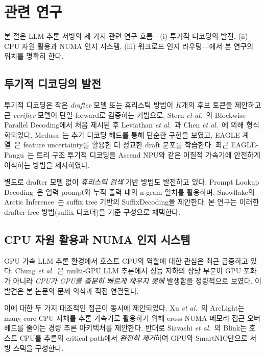 
\section{관련 연구}
\label{sec:related}

본 절은 LLM 추론 서빙의 세 가지 관련 연구 흐름---(i) 투기적 디코딩의 발전, (ii) CPU 자원 활용과 NUMA 인지 시스템, (iii) 워크로드 인지 라우팅---에서 본 연구의 위치를 명확히 한다.

\subsection{투기적 디코딩의 발전}

투기적 디코딩은 작은 \emph{drafter} 모델 또는 휴리스틱 방법이 $K$개의 후보 토큰을 제안하고 큰 \emph{verifier} 모델이 단일 forward로 검증하는 기법으로, Stern \emph{et al.}~\cite{stern2018blockwise}의 Blockwise Parallel Decoding에서 처음 제시된 후 Leviathan \emph{et al.}~\cite{leviathan2023spec}과 Chen \emph{et al.}~\cite{chen2023spec}에 의해 형식화되었다.
Medusa~\cite{cai2024medusa}는 추가 디코딩 헤드를 통해 단순한 구현을 보였고, EAGLE 계열~\cite{li2024eagle, li2025eagle3}은 feature uncertainty를 활용한 더 정교한 draft 분포를 학습한다.
최근 EAGLE-Pangu~\cite{han2026eaglepangu}는 트리 구조 투기적 디코딩을 Ascend NPU와 같은 이질적 가속기에 안전하게 이식하는 방법을 제시하였다.

별도로 drafter 모델 없이 \emph{휴리스틱 검색} 기반 방법도 발전하고 있다.
Prompt Lookup Decoding~\cite{saxena2024prompt}은 입력 prompt와 누적 출력 내의 n-gram 일치를 활용하며, Snowflake의 Arctic Inference~\cite{snowflake-arctic}는 suffix tree 기반의 SuffixDecoding을 제안한다.
본 연구는 이러한 drafter-free 방법(suffix 디코더)을 기준 구성으로 채택한다.

\subsection{CPU 자원 활용과 NUMA 인지 시스템}

GPU 가속 LLM 추론 환경에서 호스트 CPU의 역할에 대한 관심은 최근 급증하고 있다.
Chung \emph{et al.}~\cite{chung2026cpuslowdowns}은 multi-GPU LLM 추론에서 성능 저하의 상당 부분이 GPU 포화가 아니라 \emph{CPU가 GPU를 충분히 빠르게 채우지 못해} 발생함을 정량적으로 보였다.
이 발견은 본 논문의 문제 의식과 직접 연결된다.

이에 대한 두 가지 대조적인 접근이 동시에 제안되었다.
Xu \emph{et al.}~\cite{xu2026arclight}의 ArcLight는 many-core CPU 자체를 추론 가속기로 활용하기 위해 cross-NUMA 메모리 접근 오버헤드를 줄이는 경량 추론 아키텍처를 제안한다.
반대로 Siavashi \emph{et al.}~\cite{siavashi2026blink}의 Blink는 호스트 CPU를 추론의 critical path에서 \emph{완전히 제거}하여 GPU와 SmartNIC만으로 서빙 스택을 구성한다.

